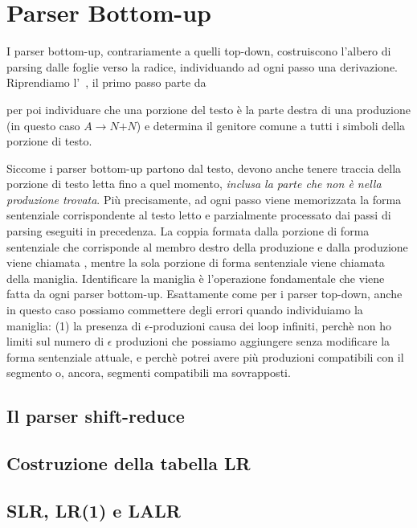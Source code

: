 \section{Parser Bottom-up}
\label{sec:parser-bottom-up}

I parser bottom-up, contrariamente a quelli top-down, costruiscono l'albero di parsing dalle foglie verso la radice,
individuando ad ogni passo una derivazione.
Riprendiamo l'~, il primo passo parte da



per poi individuare che una porzione del testo è la parte destra di una produzione (in questo caso $A\to N \mathtt{+} N $) e
determina il genitore comune a tutti i simboli della porzione di testo.



Siccome i parser bottom-up partono dal testo, devono anche tenere traccia della porzione di testo letta fino a quel
momento, \textit{inclusa la parte che non è nella produzione trovata}.
Più precisamente, ad ogni passo viene memorizzata la forma sentenziale corrispondente al testo letto e parzialmente
processato dai passi di parsing eseguiti in precedenza.
La coppia formata dalla  porzione di forma sentenziale che corrisponde al membro destro della produzione e dalla produzione  viene
chiamata , mentre la sola porzione di forma sentenziale viene chiamata  della maniglia.
Identificare la maniglia è l'operazione fondamentale che viene fatta da ogni parser bottom-up.
Esattamente come per i parser top-down, anche in questo caso possiamo commettere degli errori quando individuiamo la
maniglia: (1) la presenza di $\epsilon$-produzioni causa dei loop infiniti, perchè non ho limiti sul numero di
$\epsilon$ produzioni che possiamo aggiungere senza modificare la forma sentenziale attuale, e perchè potrei avere più
produzioni compatibili con il segmento o, ancora, segmenti compatibili ma sovrapposti.




\subsection{Il parser shift-reduce}\label{sec:shift-reduce}

\subsection{Costruzione della tabella LR}\label{sec:tabella-LR}

\subsection{SLR, LR(1) e LALR}\label{sec:lr-famiglie}


